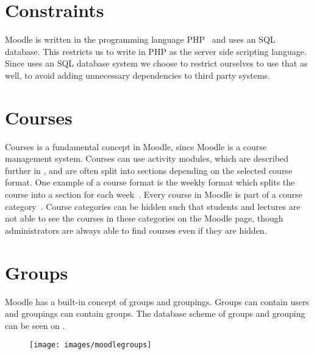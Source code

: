 

\begin{comment}
General about the platform. Tjek the initial analysis.
Moodle uses innodb and mysql (in our case atleast) 
PHP.
\end{comment}

\section{Constraints}
\label{sub:constraints}
Moodle is written in the programming language PHP~\cite{moodleabout} and uses an SQL database.
This restricts us to write \system{} in PHP as the server side scripting language.
Since \moodle{} uses an SQL database system we choose to restrict ourselves to use that as well, to avoid adding unnecessary dependencies to third party systems.


\section{Courses}
\label{sub:courses}
Courses is a fundamental concept in Moodle, since Moodle is a course management system.
Courses can use activity modules, which are described further in , and are often split into sections depending on the selected course format.
One example of a course format is the weekly format which splits the course into a section for each week~\cite{moodlecourseformat}.
Every course in Moodle is part of a course category~\cite{moodlecoursecategories}. 
Course categories can be hidden such that students and lectures are not able to see the courses in these categories on the Moodle page, though administrators are always able to find courses even if they are hidden.


\section{Groups}
\label{sec:groups}
Moodle has a built-in concept of groups and groupings. 
Groups can contain users and groupings can contain groups. 
The database scheme of groups and grouping can be seen on .

\begin{figure}
	\centering
		\texttt{[image: images/moodlegroups]}
	\label{fig:moodlegroupsandgroupings}
\end{figure}

